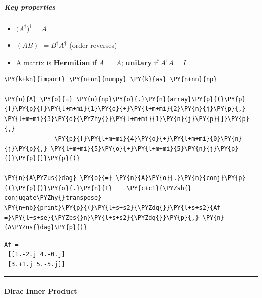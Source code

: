 \hypertarget{key-properties}{%
\subparagraph{Key properties}\label{key-properties}}

\begin{itemize}
\tightlist
\item
  \(\bigl(A^{\dagger}\bigr)^{\dagger} = A\)\\
\item
  \((AB)^{\dagger} = B^{\dagger}A^{\dagger}\) (order reverses)\\
\item
  A matrix is \textbf{Hermitian} if \(A^{\dagger}=A\); \textbf{unitary}
  if \(A^{\dagger}A = I\).
\end{itemize}

    \begin{tcolorbox}[breakable, size=fbox, boxrule=1pt, pad at break*=1mm,colback=cellbackground, colframe=cellborder]
\begin{Verbatim}[commandchars=\\\{\}]
\PY{k+kn}{import} \PY{n+nn}{numpy} \PY{k}{as} \PY{n+nn}{np}

\PY{n}{A} \PY{o}{=} \PY{n}{np}\PY{o}{.}\PY{n}{array}\PY{p}{(}\PY{p}{[}\PY{p}{[}\PY{l+m+mi}{1}\PY{o}{+}\PY{l+m+mi}{2}\PY{n}{j}\PY{p}{,} \PY{l+m+mi}{3}\PY{o}{\PYZhy{}}\PY{l+m+mi}{1}\PY{n}{j}\PY{p}{]}\PY{p}{,}
              \PY{p}{[}\PY{l+m+mi}{4}\PY{o}{+}\PY{l+m+mi}{0}\PY{n}{j}\PY{p}{,} \PY{l+m+mi}{5}\PY{o}{+}\PY{l+m+mi}{5}\PY{n}{j}\PY{p}{]}\PY{p}{]}\PY{p}{)}

\PY{n}{A\PYZus{}dag} \PY{o}{=} \PY{n}{A}\PY{o}{.}\PY{n}{conj}\PY{p}{(}\PY{p}{)}\PY{o}{.}\PY{n}{T}    \PY{c+c1}{\PYZsh{} conjugate\PYZhy{}transpose}
\PY{n+nb}{print}\PY{p}{(}\PY{l+s+s2}{\PYZdq{}}\PY{l+s+s2}{A† =}\PY{l+s+se}{\PYZbs{}n}\PY{l+s+s2}{\PYZdq{}}\PY{p}{,} \PY{n}{A\PYZus{}dag}\PY{p}{)}
\end{Verbatim}
\end{tcolorbox}

    \begin{Verbatim}[commandchars=\\\{\}]
A† =
 [[1.-2.j 4.-0.j]
 [3.+1.j 5.-5.j]]
    \end{Verbatim}

    \begin{center}\rule{0.5\linewidth}{0.5pt}\end{center}

\hypertarget{dirac-inner-product}{%
\paragraph{Dirac Inner Product}\label{dirac-inner-product}}

